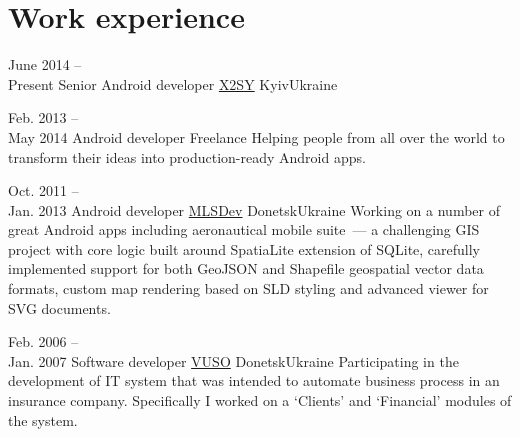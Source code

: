 \medskip
\section{Work experience}

\cventry
    {June 2014 --\\Present}
    {Senior Android developer}
    {\href{http://x2sy.com/}{X2SY}}
    {Kyiv}{Ukraine}
    {
        \iftoggle{is_nda_compliant}
            {
                Building Android app with advanced media playback features for
                an industry-leading local OTT service.\newline
            }
            {
                Building a set of mobile and TV user-friendly Android apps with 
				advanced media playback features for 
				\href{http://megogo.net/}{MEGOGO.NET}~--- an industry-leading 
                local OTT service.
                Working on the proprietary VAST-compliant video player which 
				supports content protected with Widevine Classic DRM, HLS and  
				MPEG-DASH adaptive playbacks, as well as  different types of 
				video ads.
				The core playback features are implemented by using Google's 
				modern ExoPlayer library, more traditional framework APIs from 
				\texttt{android.media} and \texttt{android.drm} packages and a 
				number of third-party SDKs like Vitamio and SolBox.\newline
            }
    }

\cventry
    {Feb. 2013 --\\May 2014}
    {Android developer}
    {Freelance}
    {}{}
    {Helping people from all over the world to transform their ideas into 
    production-ready Android apps.\newline}

\cventry
    {Oct. 2011 --\\Jan. 2013}
    {Android developer}
    {\href{http://mlsdev.com/}{MLSDev}}
    {Donetsk}{Ukraine}
    {Working on a number of great Android apps including aeronautical mobile 
    suite~--- a challenging GIS project with core logic built around SpatiaLite 
    extension of SQLite, carefully implemented support for both GeoJSON and 
    Shapefile geospatial vector data formats, custom map rendering based on SLD 
    styling and advanced viewer for SVG documents.\newline}

\cventry
    {Feb. 2006 --\\Jan. 2007}
    {Software developer}
    {\href{http://vuso.ua/}{VUSO}}
    {Donetsk}{Ukraine}
    {Participating in the development of IT system that was intended to 
    automate business process in an insurance company. Specifically I worked on 
    a `Clients' and `Financial' modules of the system.}


